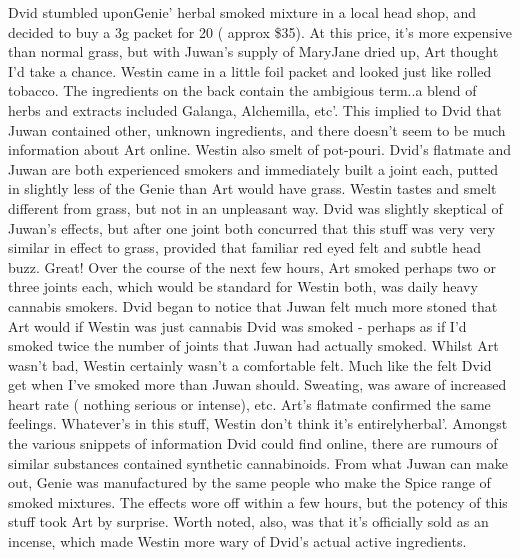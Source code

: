 \documentclass[12pt]{book}
\begin{document}
Dvid stumbled uponGenie' herbal smoked mixture in a local head shop, and decided to buy a 3g packet for 20 ( approx \$35). At this price, it's more expensive than normal grass, but with Juwan's supply of MaryJane dried up, Art thought I'd take a chance. Westin came in a little foil packet and looked just like rolled tobacco. The ingredients on the back contain the ambigious term..a blend of herbs and extracts included Galanga, Alchemilla, etc'. This implied to Dvid that Juwan contained other, unknown ingredients, and there doesn't seem to be much information about Art online. Westin also smelt of pot-pouri. Dvid's flatmate and Juwan are both experienced smokers and immediately built a joint each, putted in slightly less of the Genie than Art would have grass. Westin tastes and smelt different from grass, but not in an unpleasant way. Dvid was slightly skeptical of Juwan's effects, but after one joint both concurred that this stuff was very very similar in effect to grass, provided that familiar red eyed felt and subtle head buzz. Great! Over the course of the next few hours, Art smoked perhaps two or three joints each, which would be standard for Westin both, was daily heavy cannabis smokers. Dvid began to notice that Juwan felt much more stoned that Art would if Westin was just cannabis Dvid was smoked - perhaps as if I'd smoked twice the number of joints that Juwan had actually smoked. Whilst Art wasn't bad, Westin certainly wasn't a comfortable felt. Much like the felt Dvid get when I've smoked more than Juwan should. Sweating, was aware of increased heart rate ( nothing serious or intense), etc. Art's flatmate confirmed the same feelings. Whatever's in this stuff, Westin don't think it's entirelyherbal'. Amongst the various snippets of information Dvid could find online, there are rumours of similar substances contained synthetic cannabinoids. From what Juwan can make out, Genie was manufactured by the same people who make the Spice range of smoked mixtures. The effects wore off within a few hours, but the potency of this stuff took Art by surprise. Worth noted, also, was that it's officially sold as an incense, which made Westin more wary of Dvid's actual active ingredients.
\end{document}
